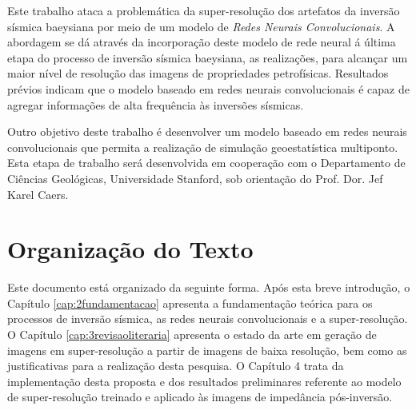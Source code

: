 Este trabalho ataca a problemática da super-resolução dos artefatos da inversão sísmica baeysiana 
por meio de um modelo de \textit{Redes Neurais Convolucionais}.
A abordagem se dá através da incorporação deste modelo de rede neural á última
etapa do processo de inversão sísmica baeysiana, as realizações, para alcançar um maior nível de
resolução das imagens de propriedades petrofísicas.
Resultados prévios indicam que o modelo baseado em redes neurais convolucionais é capaz
de agregar informações de alta frequência às inversões sísmicas.

Outro objetivo deste trabalho é desenvolver um modelo baseado em redes neurais convolucionais que permita a
realização de simulação geoestatística multiponto. Esta etapa de trabalho será desenvolvida
em cooperação com o Departamento de Ciências Geológicas, Universidade Stanford, sob
orientação do Prof. Dor. Jef Karel Caers.


\section{Organização do Texto}

Este documento está organizado da seguinte forma. Após esta breve introdução, o
Capítulo \ref{cap:2fundamentacao} apresenta a fundamentação teórica para os
processos de inversão sísmica, as redes neurais 
convolucionais e a super-resolução. O Capítulo \ref{cap:3revisaoliteraria} 
apresenta o estado da arte 
em geração de imagens em super-resolução a partir de imagens de baixa resolução, bem como as justificativas 
para a realização desta pesquisa.
O Capítulo 4 %
trata da implementação desta proposta e dos resultados 
preliminares referente ao modelo de super-resolução treinado e aplicado às imagens 
de impedância pós-inversão. 

